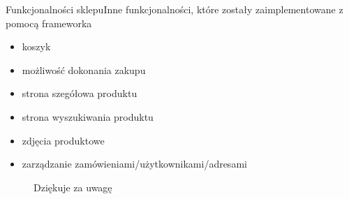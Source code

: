 \documentclass[polish,xcolor=table,9pt,aspectratio=1610,hyperref={pdfpagemode=FullScreen}]{beamer}
\begin{document}
\begin{frame}{Funkcjonalności sklepu}{Inne funkcjonalności, które zostały zaimplementowane z pomocą frameworka}
\begin{itemize}
	\item<1-> koszyk
	\item<1-> możliwość dokonania zakupu
	\item<1-> strona szegółowa produktu
	\item<1-> strona wyszukiwania produktu
	\item<1-> zdjęcia produktowe
	\item<1-> zarządzanie zamówieniami/użytkownikami/adresami 
\end{itemize}
\end{frame}

\begin{frame}
\begin{figure}
	Dziękuje za uwagę
\end{figure}
\end{frame}
\end{document}
